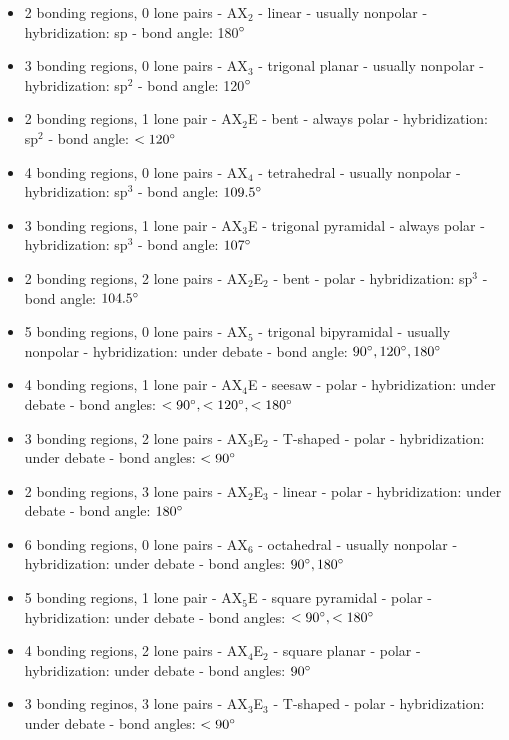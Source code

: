 \documentclass[../hchem.tex]{subfiles}
\begin{document}
\begin{itemize}
    \item 2 bonding regions, 0 lone pairs - AX$_2$ - linear - usually nonpolar - hybridization: sp - bond angle: 180$\degree$
    \item 3 bonding regions, 0 lone pairs - AX$_3$ - trigonal planar - usually nonpolar - hybridization: sp$^2$ - bond angle: 120$\degree$
    \item 2 bonding regions, 1 lone pair - AX$_2$E - bent - always polar - hybridization: sp$^2$ - bond angle: $<120\degree$
    \item 4 bonding regions, 0 lone pairs - AX$_4$ - tetrahedral - usually nonpolar - hybridization: sp$^3$ - bond angle: $109.5\degree$
    \item 3 bonding regions, 1 lone pair - AX$_3$E - trigonal pyramidal - always polar - hybridization: sp$^3$ - bond angle: $107\degree$
    \item 2 bonding regions, 2 lone pairs - AX$_2$E$_2$ - bent - polar - hybridization: sp$^3$ - bond angle: $104.5\degree$
    \item 5 bonding regions, 0 lone pairs - AX$_5$ - trigonal bipyramidal - usually nonpolar - hybridization: under debate - bond angle: $90\degree, 120\degree, 180\degree$
    \item 4 bonding regions, 1 lone pair - AX$_4$E - seesaw - polar - hybridization: under debate - bond angles: $<90\degree, <120\degree, <180\degree$
    \item 3 bonding regions, 2 lone pairs - AX$_3$E$_2$ - T-shaped - polar - hybridization: under debate - bond angles: $<90\degree$
    \item 2 bonding regions, 3 lone pairs - AX$_2$E$_3$ - linear - polar - hybridization: under debate - bond angle: $180\degree$
    \item 6 bonding regions, 0 lone pairs - AX$_6$ - octahedral - usually nonpolar - hybridization: under debate - bond angles: $90\degree, 180\degree$
    \item 5 bonding regions, 1 lone pair - AX$_5$E - square pyramidal - polar - hybridization: under debate - bond angles: $<90\degree, <180\degree$
    \item 4 bonding regions, 2 lone pairs - AX$_4$E$_2$ - square planar - polar - hybridization: under debate - bond angles: $90\degree$
    \item 3 bonding reginos, 3 lone pairs - AX$_3$E$_3$ - T-shaped - polar - hybridization: under debate - bond angles: $<90\degree$
\end{itemize}
\end{document}
